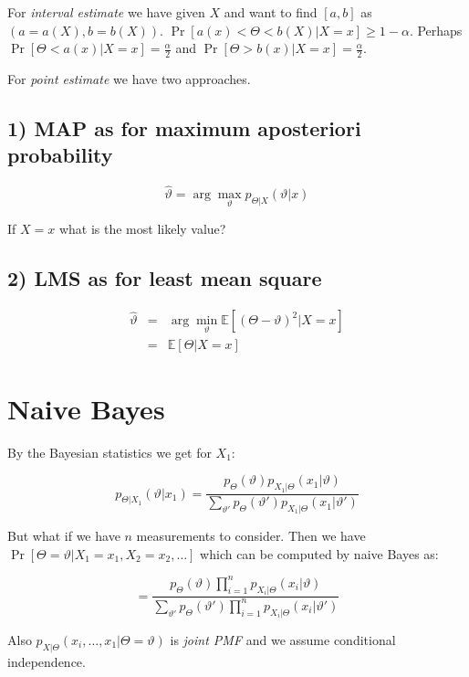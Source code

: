 For \textit{interval estimate} we have given $X$ and want to find $[a,b]$ as $(a = a(X), b = b(X))$. $\Pr[a(x) < \Theta < b(X) \vert X = x] \geq 1 - \alpha$. Perhaps $\Pr[\Theta < a(x) \vert X =x ] = \frac{\alpha}{2}$ and $\Pr[\Theta > b(x) \vert X =x ] = \frac{\alpha}{2}$.

For \textit{point estimate} we have two approaches.

\subsection{1) MAP as for maximum aposteriori probability}

$$
\hat{\vartheta} = \arg\max_{\vartheta} p_{\Theta \vert X} (\vartheta \vert x)
$$

If $X = x$ what is the most likely value?

\subsection{2) LMS as for least mean square}

$$
\begin{array}{rcl}
\hat{\vartheta} & = & \arg\min_{\vartheta} \mathbb{E}[(\Theta - \vartheta)^{2} \vert X = x] \\
& = & \mathbb{E}[\Theta \vert X = x]
\end{array}
$$

\section{Naive Bayes}

By the Bayesian statistics we get for $X_{1}$:

$$
p_{\Theta\vert X_{1}} (\vartheta \vert x_{1}) = \frac{p_{\Theta}(\vartheta) p_{X_{1} \vert\Theta}(x_{1} \vert \vartheta)}{\sum_{\vartheta'} p_{\Theta}(\vartheta')p_{X_{1}\vert\Theta}(x_{1} \vert \vartheta')}
$$

But what if we have $n$ measurements to consider. Then we have $\Pr[\Theta = \vartheta \vert X_{1} = x_{1}, X_{2} = x_{2}, \dots]$ which can be computed by naive Bayes as:

$$
= \frac{p_{\Theta}(\vartheta) \prod_{i=1}^{n}p_{X_{i}\vert \Theta} (x_{i} \vert \vartheta)}{\sum_{\vartheta'} p_{\Theta}(\vartheta')\prod_{i=1}^{n}p_{X_{i}\vert \Theta} (x_{i} \vert \vartheta')}
$$

Also $p_{X \vert \Theta}(x_{i}, \dots, x_{1} \vert \Theta = \vartheta)$ is \textit{joint PMF} and we assume conditional independence.

